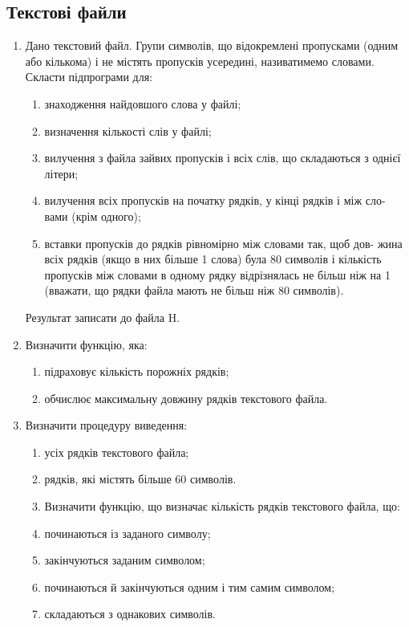 \documentclass[]{article}
\makeatletter
\newcommand{\xslalph}[1]{\expandafter\@xslalph\csname c@#1\endcsname}
\newcommand{\@xslalph}[1]{%
    \ifcase#1\or а\or б\or в\or г\or д\or e\or є\or ж\or з\or i%
    \or й\or к\or л\or м\or н\or о\or п\or р\or с\or т%
    \or у\or ф\or х\or ц\or ч\or ш\or ю\or я\or аа\or бб\or вв %
    \else\@ctrerr\fi%
}
\makeatother
\begin{document}
\subsection{Текстові файли }
\begin{enumerate}
\def\labelenumi{\arabic{enumi}.}

\item  Дано текстовий файл. Групи символів, що відокремлені пропусками (одним  або  кількома)  і  не містять  пропусків  усередині,  називатимемо словами. Скласти підпрограми для: 
\begin{enumerate}[label=\xslalph*)]
\item знаходження найдовшого слова у файлі; 
\item визначення кількості слів у файлі; 
\item вилучення з файла зайвих пропусків і всіх слів, що складаються з 
однієї літери; 
\item вилучення всіх пропусків на початку рядків, у кінці рядків і між сло-
вами (крім одного); 
\item вставки пропусків до рядків рівномірно між словами так, щоб дов-
жина всіх рядків (якщо в них більше 1 слова) була 80 символів і кількість 
пропусків між  словами  в  одному  рядку  відрізнялась  не  більш  ніж  на  1 
(вважати, що рядки файла мають не більш ніж 80 символів). 
\end{enumerate}
Результат записати до файла H.

\item  Визначити функцію, яка:
 \begin{enumerate}[label=\xslalph*)]
\item підраховує кількість порожніх рядків; 
\item обчислює максимальну довжину рядків текстового файла. 
\end{enumerate}
\item  Визначити процедуру виведення: 
\begin{enumerate}[label=\xslalph*)]
\item усіх рядків текстового файла; 
\item рядків, які містять більше 60 символів. 

\item  Визначити функцію, що визначає кількість рядків текстового файла, що: 
\item починаються із заданого символу; 
\item закінчуються заданим символом; 
\item починаються й закінчуються одним і тим самим символом; 
\item складаються з однакових символів.
\end{enumerate}


\end{enumerate}
\end{document}
